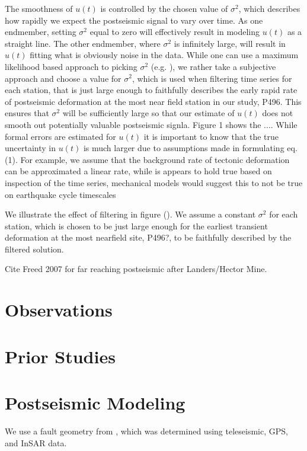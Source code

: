 \documentclass[12pt]{article}
\begin{document}
The smoothness of $u(t)$ is controlled by the chosen value of $\sigma^2$, which describes how rapidly we expect the postseismic signal to vary over time. As one endmember, setting $\sigma^2$ equal to zero will effectively result in modeling $u(t)$ as a straight line. The other endmember, where $\sigma^2$ is infinitely large, will result in $u(t)$ fitting what is obviously noise in the data. While one can use a maximum likelihood based approach to picking $\sigma^2$ (e.g. \cite{Segall1997}), we rather take a subjective approach and choose a value for $\sigma^2$, which is used when filtering time series for each station, that is just large enough to faithfully describes the early rapid rate of postseismic deformation at the most near field station in our study, P496.  This ensures that $\sigma^2$ will be sufficiently large so that our estimate of $u(t)$ does not smooth out potentially valuable postseismic signla.  Figure 1 shows the .... While formal errors are estimated for $u(t)$ it is important to know that the true uncertainty in $u(t)$ is much larger due to assumptions made in formulating eq. (1).  For example, we assume that the background rate of tectonic deformation can be approximated a linear rate, while is appears to hold true based on inspection of the time series, mechanical models would suggest this to not be true on earthquake cycle timescales 

             

We illustrate the effect of filtering in figure ().  We assume a constant $\sigma^2$ for each station, which is chosen to be just large enough for the earliest transient deformation at the most nearfield site, P496?, to be faithfully described by the filtered solution.

Cite Freed 2007 for far reaching postseismic after Landers/Hector Mine.

\section*{Observations}

\section*{Prior Studies}

\section*{Postseismic Modeling}

We use a fault geometry from \cite{Wei2011}, which was determined using teleseismic, GPS, and InSAR data.  
\end{document}
